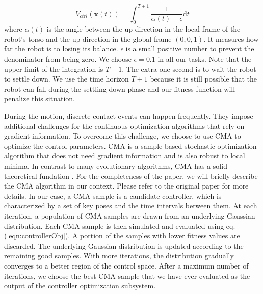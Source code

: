 \begin{equation}
  V_{ctrl}(\mathbf{x}(t))=\int_0^{T+1} \frac{1}{\alpha(t)+\epsilon}\mathrm{d}t
  \label{eqn:controllerObj}
\end{equation}
where $\alpha(t)$ is the angle between the up direction in the local frame of the robot's torso and the up direction in the global frame $(0,0,1)$. It measures how far the robot is to losing its balance. $\epsilon$ is a small positive number to prevent the denominator from being zero. We choose $\epsilon=0.1$ in all our tasks. Note that the upper limit of the integration is $T+1$. The extra one second is to wait the robot to settle down. We use the time horizon $T+1$ because it is still possible that the robot can fall during the settling down phase and our fitness function will penalize this situation.

During the motion, discrete contact events can happen frequently. They impose additional challenges for the continuous optimization algorithms that rely on gradient information. To overcome this challenge, we choose to use CMA to optimize the control parameters. CMA is a sample-based stochastic optimization algorithm that does not need gradient information and is also robust to local minima. In contrast to many evolutionary algorithms, CMA has a solid theoretical fundation \cite{akimoto:2010,glasmachers:2010}. For the completeness of the paper, we will briefly describe the CMA algorithm in our context. Please refer to the original paper \cite{Hansen:2009} for more details. In our case, a CMA sample is a candidate controller, which is characterized by a set of key poses and the time intervals between them. At each iteration, a population of CMA samples are drawn from an underlying Gaussian distribution. Each CMA sample is then simulated and evaluated using eq.(\ref{eqn:controllerObj}). A portion of the samples with lower fitness values are discarded. The underlying Gaussian distribution is updated according to the remaining good samples. With more iterations, the distribution gradually converges to a better region of the control space. After a maximum number of iterations, we choose the best CMA sample that we have ever evaluated as the output of the controller optimization subsystem.
